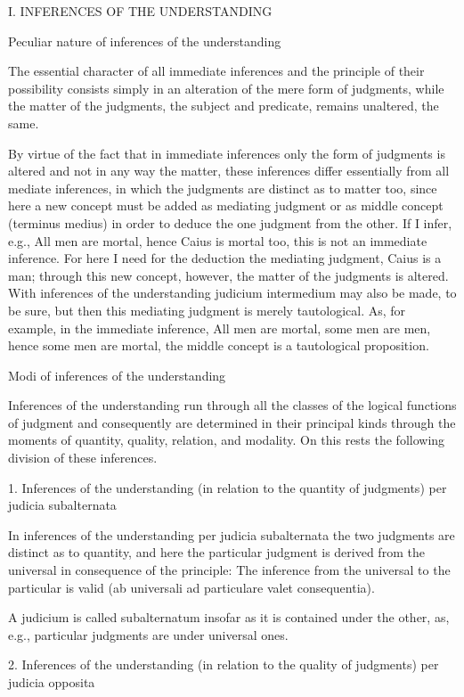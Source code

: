 I. INFERENCES OF THE UNDERSTANDING

Peculiar nature of inferences of the understanding

The essential character of all immediate inferences and
the principle of their possibility consists simply in
an alteration of the mere form of judgments,
while the matter of the judgments,
the subject and predicate, remains unaltered, the same.

    By virtue of the fact that in immediate inferences
    only the form of judgments is altered and not in any way the matter,
    these inferences differ essentially from all mediate inferences,
    in which the judgments are distinct as to matter too,
    since here a new concept must be added as mediating judgment or
    as middle concept (terminus medius) in order to deduce the
    one judgment from the other. If I infer, e.g.,
    All men are mortal, hence Caius is mortal too,
    this is not an immediate inference.
    For here I need for the deduction the mediating judgment, Caius is a man;
    through this new concept, however, the matter of the judgments is altered.
    With inferences of the understanding judicium intermedium may also be made,
    to be sure, but then this mediating judgment is merely tautological.
    As, for example, in the immediate inference,
    All men are mortal, some men are men, hence some men are mortal,
    the middle concept is a tautological proposition.

Modi of inferences of the understanding

Inferences of the understanding run through all the classes of
the logical functions of judgment and consequently are determined
in their principal kinds through the moments of
quantity, quality, relation, and modality.
On this rests the following division of these inferences.

1. Inferences of the understanding
(in relation to the quantity of judgments)
per judicia subalternata

In inferences of the understanding per judicia subalternata
the two judgments are distinct as to quantity, and here
the particular judgment is derived from the universal
in consequence of the principle:
The inference from the universal to the particular is valid
(ab universali ad particulare valet consequentia).

    A judicium is called subalternatum insofar as it is contained under the other,
    as, e.g., particular judgments are under universal ones.

2. Inferences of the understanding
(in relation to the quality of judgments)
per judicia opposita

